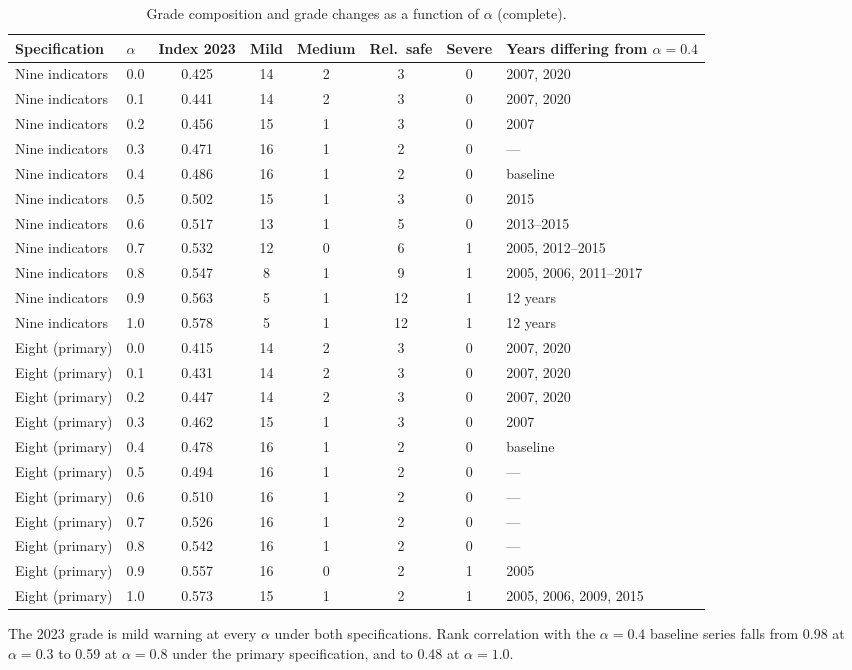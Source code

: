 \documentclass[preprint,11pt,authoryear]{elsarticle}
\begin{document}
\begin{table}[htbp]
\centering
\caption{Grade composition and grade changes as a function of $\alpha$ (complete).}
\label{tab:alpha-full}
\footnotesize
\setlength{\tabcolsep}{4pt}
\begin{tabular}{llcccccl}
\toprule
Specification & $\alpha$ & Index 2023 & Mild & Medium & Rel.\ safe & Severe & Years differing from $\alpha=0.4$ \\
\midrule
Nine indicators & 0.0 & 0.425 & 14 & 2 & 3 & 0 & 2007, 2020 \\
Nine indicators & 0.1 & 0.441 & 14 & 2 & 3 & 0 & 2007, 2020 \\
Nine indicators & 0.2 & 0.456 & 15 & 1 & 3 & 0 & 2007 \\
Nine indicators & 0.3 & 0.471 & 16 & 1 & 2 & 0 & --- \\
Nine indicators & 0.4 & 0.486 & 16 & 1 & 2 & 0 & baseline \\
Nine indicators & 0.5 & 0.502 & 15 & 1 & 3 & 0 & 2015 \\
Nine indicators & 0.6 & 0.517 & 13 & 1 & 5 & 0 & 2013--2015 \\
Nine indicators & 0.7 & 0.532 & 12 & 0 & 6 & 1 & 2005, 2012--2015 \\
Nine indicators & 0.8 & 0.547 & 8 & 1 & 9 & 1 & 2005, 2006, 2011--2017 \\
Nine indicators & 0.9 & 0.563 & 5 & 1 & 12 & 1 & 12 years \\
Nine indicators & 1.0 & 0.578 & 5 & 1 & 12 & 1 & 12 years \\
\midrule
Eight (primary) & 0.0 & 0.415 & 14 & 2 & 3 & 0 & 2007, 2020 \\
Eight (primary) & 0.1 & 0.431 & 14 & 2 & 3 & 0 & 2007, 2020 \\
Eight (primary) & 0.2 & 0.447 & 14 & 2 & 3 & 0 & 2007, 2020 \\
Eight (primary) & 0.3 & 0.462 & 15 & 1 & 3 & 0 & 2007 \\
Eight (primary) & 0.4 & 0.478 & 16 & 1 & 2 & 0 & baseline \\
Eight (primary) & 0.5 & 0.494 & 16 & 1 & 2 & 0 & --- \\
Eight (primary) & 0.6 & 0.510 & 16 & 1 & 2 & 0 & --- \\
Eight (primary) & 0.7 & 0.526 & 16 & 1 & 2 & 0 & --- \\
Eight (primary) & 0.8 & 0.542 & 16 & 1 & 2 & 0 & --- \\
Eight (primary) & 0.9 & 0.557 & 16 & 0 & 2 & 1 & 2005 \\
Eight (primary) & 1.0 & 0.573 & 15 & 1 & 2 & 1 & 2005, 2006, 2009, 2015 \\
\bottomrule
\end{tabular}

\vspace{2pt}
{\scriptsize The 2023 grade is mild warning at every $\alpha$ under both specifications. Rank correlation with the $\alpha=0.4$ baseline series falls from 0.98 at $\alpha=0.3$ to 0.59 at $\alpha=0.8$ under the primary specification, and to 0.48 at $\alpha=1.0$.}
\end{table}
\end{document}
